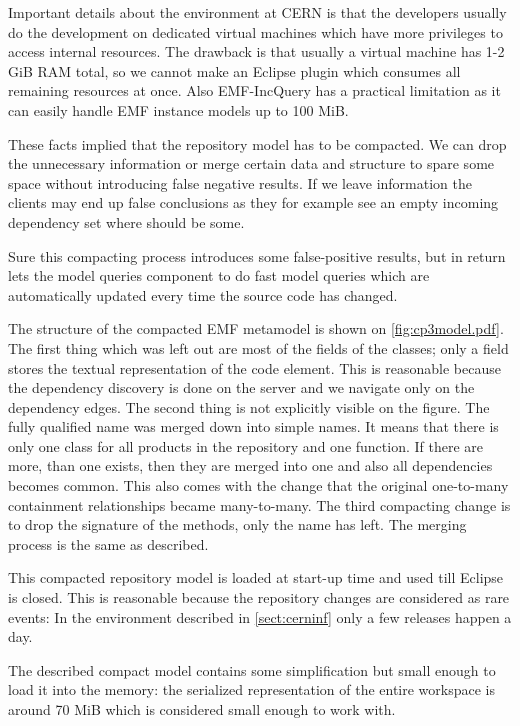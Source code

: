 Important details about the environment at CERN is that the developers usually
do the development on dedicated virtual machines which have more privileges to
access internal resources. The drawback is that usually a virtual machine has
1-2 GiB RAM total, so we cannot make an Eclipse plugin which consumes all
remaining resources at once. Also EMF-IncQuery has a practical limitation as it
can easily handle EMF instance models up to 100 MiB.

These facts implied that the repository model has to be compacted. We can drop
the unnecessary information or merge certain data and structure to spare some
space without introducing false negative results. If we leave information the
clients may end up false conclusions as they for example see an empty incoming
dependency set where should be some. 

Sure this compacting process introduces some false-positive results, but in 
return lets the model queries component to do fast model queries which
are automatically updated every time the source code has changed. 

The structure of the compacted EMF metamodel is shown on \autoref{fig:cp3model.pdf}.
The first thing which was left out are most of the fields of the classes; only a
 field stores the textual representation of the code element. This is
reasonable because the dependency discovery is done on the server and we
navigate only on the dependency edges. The second thing is not explicitly
visible on the figure. The fully qualified name was merged down into simple
names. It means that there is only one  class for all products in
the repository and one  function. If there are more, than one
exists, then they are merged into one and also all dependencies becomes common. This
also comes with the change that the original one-to-many containment
relationships became many-to-many. The third compacting change is to drop the
signature of the methods, only the name has left. The merging process is the
same as described.

This compacted repository model is loaded at start-up time and used till Eclipse
is closed. This is reasonable because the repository changes are considered as rare events: 
In the environment described in \autoref{sect:cerninf} only a few releases happen a day.

The described compact model contains some simplification but small enough to
load it into the memory: the serialized representation of the entire workspace is
around 70 MiB which is considered small enough to work with. 

